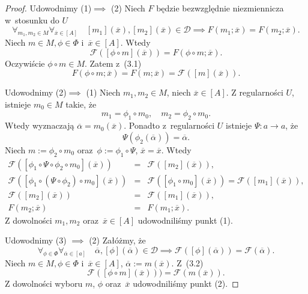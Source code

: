 \documentclass[12pt,a4paper]{report}
\newcommand{\domkniecie}[1]{\left[ {#1} \right] }
\begin{document}
\begin{proof}
Udowodnimy (1)$\implies$ (2)
Niech $F$ będzie bezwzględnie niezmiennicza w~stosunku do $U$
\begin{equation}
\forall_{m_{1}, m_{2} \in M}  \forall_{\overline{x} \in \domkniecie{A}} \quad \domkniecie{m_1}(\overline{x}), \domkniecie{m_2}(\overline{x})\in \mathcal{D} \implies F(m_{1};\overline{x})=F(m_{2};\overline{x}).
\end{equation}
Niech $m \in M, \phi \in \Phi$ i~$\overline{x} \in \domkniecie{A}$. Wtedy
$$
\mathcal{F}(\domkniecie{\phi \circ m}(\overline{x}))=F(\phi \circ m;\overline{x}).
$$
Oczywiście $\phi \circ m \in M$. Zatem z~(3.1)
$$
F(\phi \circ m; \overline{x})=F(m;\overline{x})=\mathcal{F}(\domkniecie{m}(\overline{x})).
$$

Udowodnimy (2)$\implies$ (1)
Niech $m_1,m_2 \in M$, niech $\overline{x} \in\domkniecie{A}$.
Z regularności $U$, istnieje $m_0\in M$ takie, że
$$
m_1=\phi_1\circ m_0, \quad m_2=\phi_2\circ m_0.
$$
Wtedy wyznaczają $\overline{\alpha}=m_0(\overline{x})$.
Ponadto z~regularności $U$ istnieje $\Psi:a\to a$, że
$$
 \Psi(\phi_2(\overline{\alpha}))=\overline{\alpha}.
$$
Niech $m:=\phi_2\circ m_0$ oraz~$\phi:=\phi_1\circ\Psi$, $\overline{x}=\overline{x}$. Wtedy
\begin{eqnarray*}
\mathcal{F}(\domkniecie{\phi_1\circ \Psi\circ \phi_2 \circ m_0}(\overline{x})) & = & \mathcal{F}(\domkniecie{m_2}(\overline{x})), \\
\mathcal{F}(\domkniecie{\phi_1\circ(\Psi\circ \phi_2)\circ m_0}(\overline{x})) & = & \mathcal{F}(\domkniecie{\phi_1\circ m_0}(\overline{x})) = \mathcal{F}(\domkniecie{m_1}(\overline{x})),\\
\mathcal{F}(\domkniecie{m_2}(\overline{x})) & = & \mathcal{F}(\domkniecie{m_1}(\overline{x})),\\
F(m_2;\overline{x}) & = & F(m_1;\overline{x}).
\end{eqnarray*}
Z dowolności $m_1,m_2$ oraz~$\overline{x} \in \domkniecie{A}$ udowodniliśmy punkt (1).

Udowodnimy (3) $\implies$ (2)
Załóżmy, że
\begin{equation}
\forall_{\phi \in \Phi} \forall_{\overline{\alpha} \in \domkniecie{a}} \quad \overline{\alpha}, \domkniecie{\phi}(\overline{\alpha})\in \mathcal{D} \implies \mathcal{F}(\domkniecie{\phi}(\overline{\alpha}))=\mathcal{F}(\overline{\alpha}).
\end{equation}
Niech $m\in M, \phi \in \Phi$ i~$\overline{x} \in\domkniecie{A}$, $\overline{\alpha}:=m(\overline{x})$. Z~(3.2)
$$
 \mathcal{F}(\domkniecie{\phi\circ m}(\overline{x})))=\mathcal{F}(m(\overline{x})).
$$
Z dowolności wyboru $m$, $\phi$ oraz~$\overline{x}$ udowodniliśmy punkt (2).


\end{proof}
\end{document}
